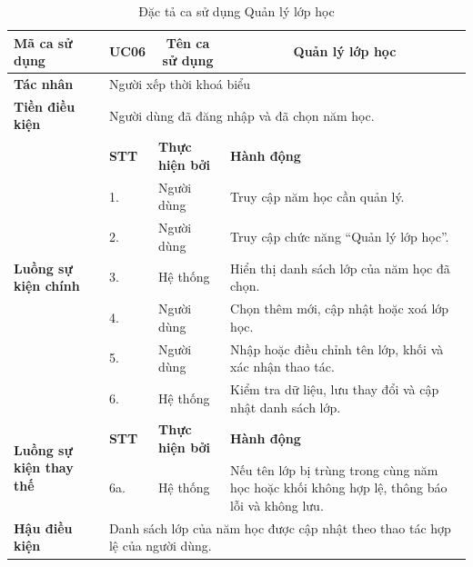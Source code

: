 \documentclass[../DoAn.tex]{subfiles}
\begin{document}
\begin{longtable}{|p{2.8cm}|p{1cm}|p{2.8cm}|p{6.3cm}|}
\caption{Đặc tả ca sử dụng Quản lý lớp học}
\label{tab:app_uc_quan_ly_lop_hoc} \\
\hline
\multicolumn{1}{|l|}{\textbf{Mã ca sử dụng}} & \multicolumn{1}{c|}{UC06} &
\multicolumn{1}{c|}{\textbf{Tên ca sử dụng}} & \multicolumn{1}{c|}{Quản lý lớp học} \\
\hline
\multicolumn{1}{|l|}{\textbf{Tác nhân}} & \multicolumn{3}{l|}{Người xếp thời khoá biểu} \\
\hline
\multicolumn{1}{|l|}{\textbf{Tiền điều kiện}} & \multicolumn{3}{l|}{Người dùng đã đăng nhập và đã chọn năm học.} \\
\hline
\multirow{7}{2.8cm}{\textbf{Luồng sự kiện chính}} & \textbf{STT} & \textbf{Thực hiện bởi} & \textbf{Hành động} \\
\cline{2-4}
& 1. & Người dùng & Truy cập năm học cần quản lý. \\
\cline{2-4}
& 2. & Người dùng & Truy cập chức năng ``Quản lý lớp học''. \\
\cline{2-4}
& 3. & Hệ thống & Hiển thị danh sách lớp của năm học đã chọn. \\
\cline{2-4}
& 4. & Người dùng & Chọn thêm mới, cập nhật hoặc xoá lớp học. \\
\cline{2-4}
& 5. & Người dùng & Nhập hoặc điều chỉnh tên lớp, khối và xác nhận thao tác. \\
\cline{2-4}
& 6. & Hệ thống & Kiểm tra dữ liệu, lưu thay đổi và cập nhật danh sách lớp. \\
\hline
\multirow{2}{2.8cm}{\textbf{Luồng sự kiện thay thế}} & \textbf{STT} & \textbf{Thực hiện bởi} & \textbf{Hành động} \\
\cline{2-4}
& 6a. & Hệ thống & Nếu tên lớp bị trùng trong cùng năm học hoặc khối không hợp lệ, thông báo lỗi và không lưu. \\
\hline
\multicolumn{1}{|l|}{\textbf{Hậu điều kiện}} & \multicolumn{3}{p{10.5cm}|}{Danh sách lớp của năm học được cập nhật theo thao tác hợp lệ của người dùng.} \\
\hline
\end{longtable}
\end{document}
